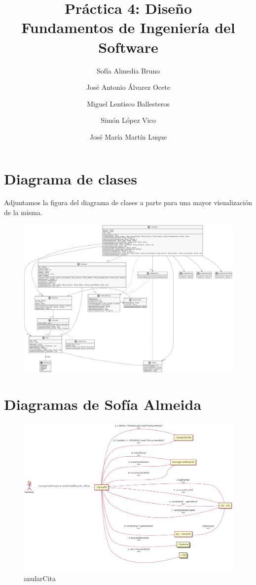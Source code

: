 \documentclass[11pt,a4paper]{article}
\title{Práctica 4: Diseño \large\\ Fundamentos de Ingeniería del Software}
\author{Sofía Almedia Bruno \and José Antonio Álvarez Ocete \and Miguel Lentisco Ballesteros \and Simón López Vico \and José María Martín Luque}
\begin{document}
\maketitle

\section{Diagrama de clases}

Adjuntamos la figura del diagrama de clases a parte para una mayor visualización de la misma. \\

\begin{figure}[H]
	\centering
	\includegraphics[width=\textwidth,height=\textheight,keepaspectratio]{Diagramas/diagramaClases}
\end{figure}

\section{Diagramas de Sofía Almeida}

\begin{figure}[H]
	\caption{anularCita}
	\centering
	\includegraphics[width=\textwidth,height=\textheight,keepaspectratio]{Diagramas/anularcita}
\end{figure}
\end{document}
